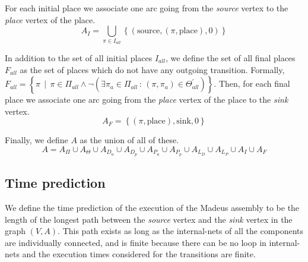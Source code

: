 For each initial place we associate one arc going from the \emph{source}
vertex to the \emph{place} vertex of the place. 
\[
A_{I}=\bigcup_{\pi\in I_{all}}\left\{ \left(\text{source},\left(\pi,\text{place}\right),0\right)\right\} 
\]

In addition to the set of all initial places $I_{all}$, we define
the set of all final places $F_{all}$ as the set of places which
do not have any outgoing transition. Formally, $F_{all}=\left\{ \pi\,\mid\,\pi\in\Pi_{all}\land\lnot\left(\exists\pi_{a}\in\Pi_{all}\,:\,\left(\pi,\pi_{a}\right)\in\Theta_{all}^{\prime}\right)\right\} $.
Then, for each final place we associate one arc going from the \emph{place}
vertex of the place to the \emph{sink} vertex. 
\[
A_{F}=\left\{ \left(\pi,\text{place}\right),\text{sink},0\right\} 
\]

Finally, we define $A$ as the union of all of these. 
\[
A=A_\Pi\cup A_{\Theta}\cup A_{D_{u}}\cup A_{D_{p}}\cup A_{P_{u}}\cup A_{P_{p}}\cup A_{L_{D}}\cup A_{L_{P}}\cup A_{I}\cup A_{F}
\]


\subsection{Time prediction}

We define the time prediction of the execution of the Madeus assembly
to be the length of the longest path between the \emph{source} vertex
and the \emph{sink} vertex in the graph $\left(V,A\right)$. This
path exists as long as the internal-nets of all the components are
individually connected, and is finite because there can be no loop
in internal-nets and the execution times considered for the transitions
are finite.

